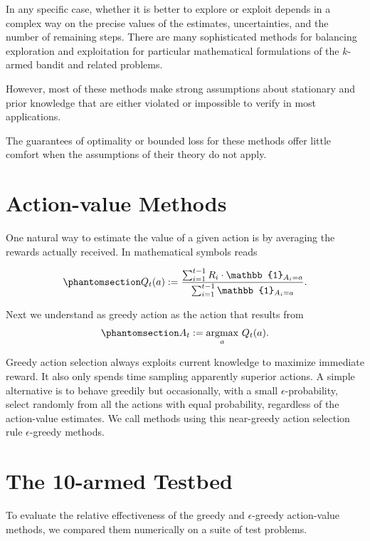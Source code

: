 \documentclass[
  letterpaper,
]{krantz}
\theoremstyle{plain}
\theoremstyle{definition}
\theoremstyle{definition}
\theoremstyle{remark}
\begin{document}
In any specific case, whether it is better to explore or exploit depends
in a complex way on the precise values of the estimates, uncertainties,
and the number of remaining steps. There are many sophisticated methods
for balancing exploration and exploitation for particular mathematical
formulations of the \(k\)-armed bandit and related problems.

However, most of these methods make strong assumptions about stationary
and prior knowledge that are either violated or impossible to verify in
most applications.

The guarantees of optimality or bounded loss for these methods offer
little comfort when the assumptions of their theory do not apply.

\section{Action-value Methods}\label{action-value-methods}

One natural way to estimate the value of a given action is by averaging
the rewards actually received. In mathematical symbols reads

\begin{equation}\phantomsection\label{eq-action_avering_kbandit}{
  Q_t(a):=
    \dfrac{
      \sum_{i=1}^{t-1}
        R_i \cdot \mathbb{1}_{A_{i} = a}
    }{\sum_{i=1}^{t-1} \mathbb{1}_{A_i=a}} .
}\end{equation}

Next we understand as greedy action as the action that results from
\begin{equation}\phantomsection\label{eq-greedy_action}{
  A_t := \underset{a}{\mathrm{argmax}} \ Q_t(a).
}\end{equation}

Greedy action selection always exploits current knowledge to maximize
immediate reward. It also only spends time sampling apparently superior
actions. A simple alternative is to behave greedily but occasionally,
with a small \(\epsilon\)-probability, select randomly from all the
actions with equal probability, regardless of the action-value
estimates. We call methods using this near-greedy action selection rule
\(\epsilon\)-greedy methods.

\section{The 10-armed Testbed}\label{the-10-armed-testbed}

To evaluate the relative effectiveness of the greedy and
\(\epsilon\)-greedy action-value methods, we compared them numerically
on a suite of test problems.
\end{document}
